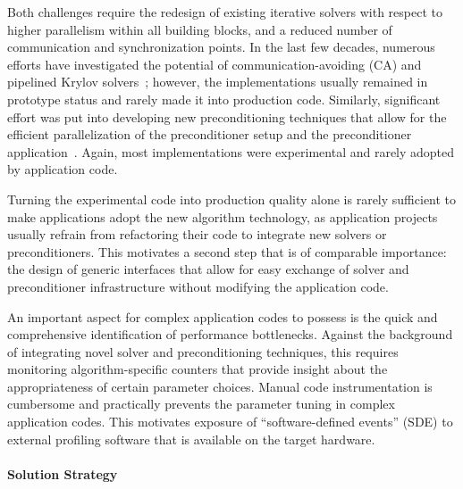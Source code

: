 Both challenges require the redesign of existing iterative solvers with respect 
to higher parallelism within all building blocks, and a reduced number of 
communication and synchronization points. In the last few decades, numerous efforts 
have investigated the potential of communication-avoiding (CA) and pipelined 
Krylov 
solvers~\cite{yamazakiipdps2014,Cornelis2018TheCC}; however, the 
implementations 
usually 
remained in prototype status and rarely made it into production code. 
Similarly, significant effort was put into developing new preconditioning 
techniques that allow for the efficient parallelization of the preconditioner 
setup and the preconditioner 
application~\cite{chowisc2015,anzteuropa2015,ANZT20181}. 
Again, most implementations were 
experimental and rarely adopted by application code.

Turning the experimental code into production quality alone is rarely 
sufficient to make applications adopt the new algorithm technology, as 
application projects usually refrain from refactoring their code to integrate 
new solvers or preconditioners. This motivates a second step that is of 
comparable importance: the design of generic interfaces that allow for easy 
exchange of solver and preconditioner infrastructure without modifying the 
application code.

An important aspect for complex application codes to possess is the quick and 
comprehensive identification of performance bottlenecks. Against the background 
of integrating novel solver and preconditioning techniques, this requires 
monitoring algorithm-specific counters that provide insight about the 
appropriateness of certain parameter choices. Manual code instrumentation is 
cumbersome and practically prevents the parameter tuning in complex application 
codes. This motivates exposure of ``software-defined events'' (SDE) to external 
profiling software that is available on the target hardware.


\paragraph{Solution Strategy}

